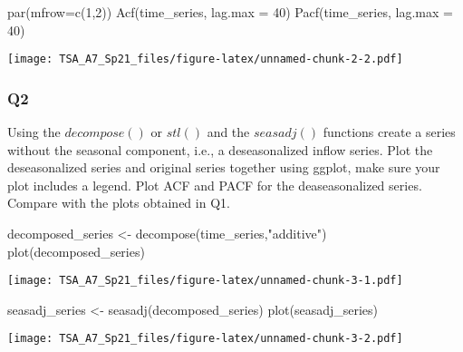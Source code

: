 \documentclass[
]{article}
\newenvironment{Shaded}{\begin{snugshade}}{\end{snugshade}}
\newcommand{\AttributeTok}[1]{\textcolor[rgb]{0.77,0.63,0.00}{#1}}
\newcommand{\DecValTok}[1]{\textcolor[rgb]{0.00,0.00,0.81}{#1}}
\newcommand{\FunctionTok}[1]{\textcolor[rgb]{0.00,0.00,0.00}{#1}}
\newcommand{\NormalTok}[1]{#1}
\newcommand{\OtherTok}[1]{\textcolor[rgb]{0.56,0.35,0.01}{#1}}
\newcommand{\StringTok}[1]{\textcolor[rgb]{0.31,0.60,0.02}{#1}}
\begin{document}
\begin{Shaded}
\begin{Highlighting}[]
\FunctionTok{par}\NormalTok{(}\AttributeTok{mfrow=}\FunctionTok{c}\NormalTok{(}\DecValTok{1}\NormalTok{,}\DecValTok{2}\NormalTok{))}
\FunctionTok{Acf}\NormalTok{(time\_series, }\AttributeTok{lag.max =} \DecValTok{40}\NormalTok{)}
\FunctionTok{Pacf}\NormalTok{(time\_series, }\AttributeTok{lag.max =} \DecValTok{40}\NormalTok{)}
\end{Highlighting}
\end{Shaded}

\texttt{[image: TSA\_A7\_Sp21\_files/figure-latex/unnamed-chunk-2-2.pdf]}

\hypertarget{q2}{%
\subsubsection{Q2}\label{q2}}

Using the \(decompose()\) or \(stl()\) and the \(seasadj()\) functions
create a series without the seasonal component, i.e., a deseasonalized
inflow series. Plot the deseasonalized series and original series
together using ggplot, make sure your plot includes a legend. Plot ACF
and PACF for the deaseasonalized series. Compare with the plots obtained
in Q1.

\begin{Shaded}
\begin{Highlighting}[]
\NormalTok{decomposed\_series }\OtherTok{\textless{}{-}} \FunctionTok{decompose}\NormalTok{(time\_series,}\StringTok{"additive"}\NormalTok{)}
\FunctionTok{plot}\NormalTok{(decomposed\_series)}
\end{Highlighting}
\end{Shaded}

\texttt{[image: TSA\_A7\_Sp21\_files/figure-latex/unnamed-chunk-3-1.pdf]}

\begin{Shaded}
\begin{Highlighting}[]
\NormalTok{seasadj\_series }\OtherTok{\textless{}{-}} \FunctionTok{seasadj}\NormalTok{(decomposed\_series)}
\FunctionTok{plot}\NormalTok{(seasadj\_series)}
\end{Highlighting}
\end{Shaded}

\texttt{[image: TSA\_A7\_Sp21\_files/figure-latex/unnamed-chunk-3-2.pdf]}
\end{document}
